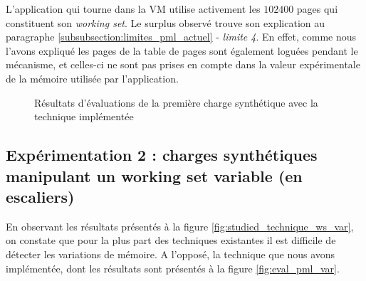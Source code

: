 L'application qui tourne dans la VM utilise activement les $102400$ pages qui constituent son \emph{working set}. Le surplus observé trouve son explication au paragraphe \ref{subsubsection:limites_pml_actuel} - \textit{limite 4}. En effet, comme nous l'avons expliqué les pages de la table de pages sont également loguées pendant le mécanisme, et celles-ci ne sont pas prises en compte dans la valeur expérimentale de la mémoire utilisée par l'application.

\begin{figure}[H]
  \centering  
  \scriptsize
\caption{Résultats d'évaluations de la première charge synthétique avec la technique implémentée}
\label{fig:eval_pml_cst}
\end{figure}

\subsection{Expérimentation 2 : charges synthétiques manipulant un working set variable (en escaliers)}
En observant les résultats présentés à la figure \ref{fig:studied_technique_ws_var}, on constate que pour la plus part des techniques existantes il est difficile de détecter les variations de mémoire. A l'opposé, la technique que nous avons implémentée, dont les résultats sont présentés à la figure \ref{fig:eval_pml_var}.\\
\par

